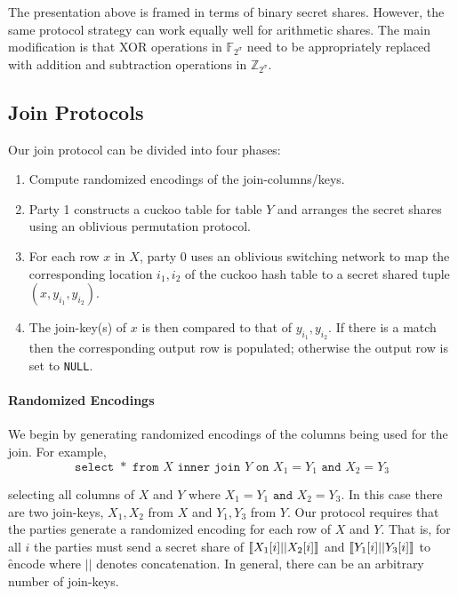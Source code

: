 The presentation above is framed in terms of binary secret shares. However, the same protocol strategy can work equally well for arithmetic shares. The main modification is that XOR operations in $\mathbb{F}_{2^\sigma}$ need to be appropriately replaced with addition and subtraction operations in $\mathbb{Z}_{2^\sigma}$. 
\fi

\subsection{Join Protocols}\label{sec:join}

Our join protocol can be divided into four phases:

\begin{enumerate}
	\item Compute randomized encodings of the join-columns/keys. 
	\item Party 1 constructs a cuckoo table for table $Y$ and arranges the secret shares using an oblivious permutation protocol. 
	\item For each row $x$ in $X$, party 0 uses an oblivious switching network to map  the corresponding location $i_1,i_2$ of the cuckoo hash table to a secret shared tuple $(x, y_{i_1}, y_{i_2})$.
	\item The join-key(s) of $x$ is then compared to that of $y_{i_1}, y_{i_2}$. If there is a match then the corresponding output row is populated; otherwise the output row is set to \texttt{NULL}.
\end{enumerate} 

\paragraph{Randomized Encodings}
We begin by generating randomized encodings of the columns being used for the join. For example, 
\iffullversion
$$
	\texttt{select }* \texttt{ from } X \texttt{ inner join } Y \texttt{ on } X_1 = Y_1 \texttt{ and } X_2 = Y_3
$$

\else
selecting all columns of $X$ and $Y$ where $X_1 = Y_1 \texttt{ and } X_2 = Y_3$.
\fi
In this case there are two join-keys, $X_1,X_2$ from $X$ and $Y_1,Y_3$ from $Y$. Our protocol requires that the parties generate a randomized encoding for each row of $X$ and $Y$. That is, for all $i$ the parties must send a secret share of $\llbracket X_1[i] || X_2[i]\rrbracket$ and $\llbracket Y_1[i] || Y_3[i]\rrbracket$ to \f{encode} where $||$ denotes concatenation. In general, there can be an arbitrary number of join-keys. 

